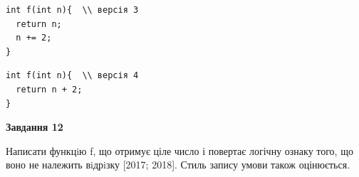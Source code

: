 \documentclass[12pt, ukrainian]{article}
\begin{document}
{\begin {large}
\begin{minipage}[t]{11.0cm}
\vspace{-8mm}\begin{verbatim}
int f(int n){  \\ версія 3
  return n;
  n += 2;
}
\end{verbatim}

\vspace{-8mm}\begin{verbatim}
int f(int n){  \\ версія 4
  return n + 2;
}
\end{verbatim}



\begin{center}
\textbf{Завдання 12}
\end{center}

Написати функцiю f, що отримує ціле число і повертає логічну ознаку того, що воно не належить вiдрiзку [2017; 2018]. Стиль запису умови також оцінюється.\par

\end{minipage}

\end {large}}
\newpage
\end{document}
